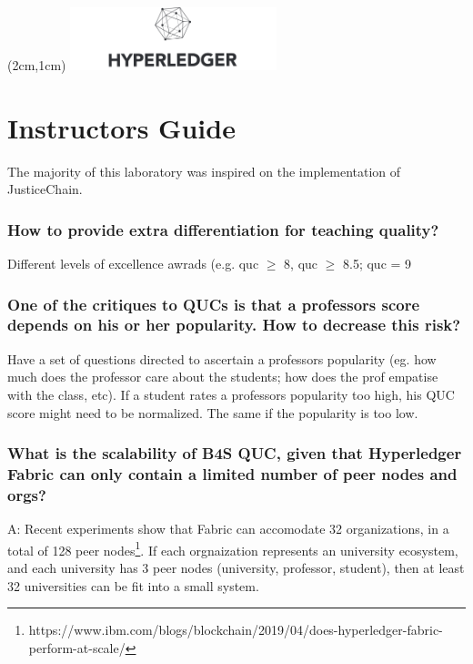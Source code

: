 \documentclass[12pt,a4paper]{article}
\begin{document}
\textblockorigin{-34pt}{-12pt}
\begin{textblock*}{10cm}(2cm,1cm)
\includegraphics[width=6cm]{hyperledger.png}
\end{textblock*}

\section*{Instructors Guide}


The majority of this laboratory was inspired on the implementation of JusticeChain\cite{belchior2019_audits}.

\subsubsection*{How to provide extra differentiation for teaching quality?}

Different levels of excellence awrads (e.g. quc $\geq$ 8, quc $\geq$ 8.5; quc = 9

\subsubsection*{One of the critiques to QUCs is that a professors score depends on his or her popularity. How to decrease this risk?}

Have a set of questions directed to ascertain a professors popularity (eg. how much does the professor care about the students; how does the prof empatise with the class, etc). If a student rates a professors popularity too high, his QUC score might need to be normalized. The same if the popularity is too low. 

\subsubsection*{What is the scalability of B4S QUC, given that Hyperledger Fabric can only contain a limited number of peer nodes and orgs?}

A: Recent experiments show that Fabric can accomodate 32 organizations, in a total of 128 peer nodes\footnote{https://www.ibm.com/blogs/blockchain/2019/04/does-hyperledger-fabric-perform-at-scale/}. If each orgnaization represents an university ecosystem, and each university has 3 peer nodes (university, professor, student), then at least 32 universities can be fit into a small system.  
\end{document}
